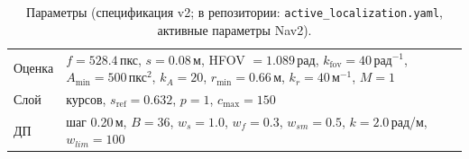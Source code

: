 \documentclass[10pt,twocolumn]{article}
\begin{document}
\begin{table}[t]
\centering\footnotesize
\caption{Параметры (спецификация v2; в репозитории: \texttt{active\_localization.yaml}, активные параметры Nav2).}
\label{tab:params}
\begin{tabularx}{\columnwidth}{@{}l>{\raggedright\arraybackslash}X@{}}
\toprule
Оценка & $f=528.4$\,пкс, $s=0.08$\,м, HFOV $=1.089$\,рад, $k_{\mathrm{fov}}=40$\,рад$^{-1}$, $A_{\min}=500$\,пкс$^2$, $k_A=20$, $r_{\min}=0.66$\,м, $k_r=40$\,м$^{-1}$, $M=1$ \\
Слой & 36 курсов, $s_{\mathrm{ref}}=0.632$, $p=1$, $c_{\max}=150$ \\
ДП & шаг 0.20\,м, $B=36$, $w_s=1.0$, $w_f=0.3$, $w_{sm}=0.5$, $k=2.0$\,рад/м, $w_{lim}=100$ \\
\bottomrule
\end{tabularx}
\end{table}
\end{document}
